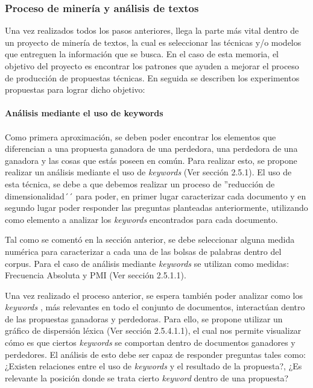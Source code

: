     
\subsubsection{Proceso de minería y análisis de textos}
    Una vez realizados todos los pasos anteriores, llega la parte más vital dentro de un proyecto de minería de textos, la cual es seleccionar las técnicas y/o modelos que entreguen la información que se busca. En el caso de esta memoria, el objetivo del proyecto es encontrar los patrones que ayuden a mejorar el proceso de producción de propuestas técnicas. En seguida se describen los experimentos propuestas para lograr dicho objetivo:

    \paragraph{Análisis mediante el uso de keywords}
    \paragraph*{}
    Como primera aproximación, se deben poder encontrar los elementos que diferencian a una propuesta ganadora de una perdedora, una perdedora de una ganadora y las cosas que estás poseen en común. Para realizar esto, se propone realizar un análisis mediante el uso de \textit{keywords} (Ver sección 2.5.1). El uso de esta técnica, se debe a que debemos realizar un proceso de ''reducción de dimensionalidad´´ para poder, en primer lugar caracterizar cada documento y en segundo lugar poder responder las preguntas planteadas anteriormente, utilizando como elemento a analizar los \textit{keywords} encontrados para cada documento.  
     
    Tal como se comentó en la sección anterior, se debe seleccionar alguna medida numérica para caracterizar a cada una de las bolsas de palabras dentro del corpus. Para el caso de análisis mediante \textit{keywords} se utilizan como medidas: Frecuencia Absoluta y PMI (Ver sección 2.5.1.1).
    
    Una vez realizado el proceso anterior, se espera también poder analizar como los \textit{keywords} , más relevantes en todo el conjunto de documentos, interactúan dentro de las propuestas ganadoras y perdedoras. Para ello, se propone utilizar un gráfico de dispersión léxica (Ver sección 2.5.4.1.1), el cual nos permite visualizar cómo es que ciertos \textit{keywords} se comportan dentro de documentos ganadores y perdedores. El análisis de esto debe ser capaz de responder preguntas tales como: ¿Existen relaciones entre el uso de \textit{keywords} y el resultado de la propuesta?, ¿Es relevante la posición donde se trata cierto \textit{keyword} dentro de una propuesta?
     
